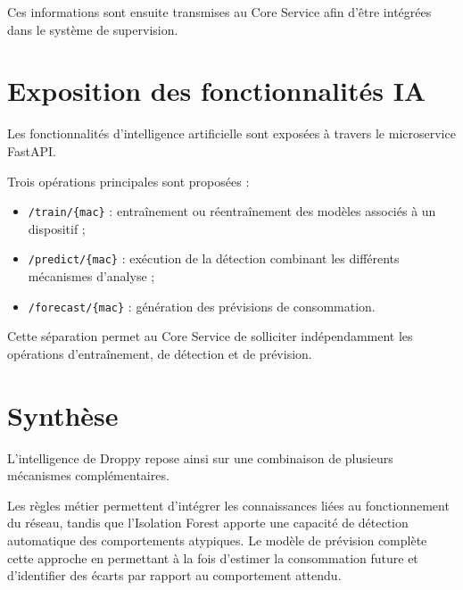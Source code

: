 Ces informations sont ensuite transmises au Core Service afin d'être
intégrées dans le système de supervision.



\section{Exposition des fonctionnalités IA}

Les fonctionnalités d'intelligence artificielle sont exposées à travers le
microservice FastAPI.

Trois opérations principales sont proposées :

\begin{itemize}

    \item \texttt{/train/\{mac\}} : entraînement ou réentraînement des
    modèles associés à un dispositif ;

    \item \texttt{/predict/\{mac\}} : exécution de la détection combinant
    les différents mécanismes d'analyse ;

    \item \texttt{/forecast/\{mac\}} : génération des prévisions de
    consommation.

\end{itemize}

Cette séparation permet au Core Service de solliciter indépendamment les
opérations d'entraînement, de détection et de prévision.



\section{Synthèse}

L'intelligence de Droppy repose ainsi sur une combinaison de plusieurs
mécanismes complémentaires.

Les règles métier permettent d'intégrer les connaissances liées au
fonctionnement du réseau, tandis que l'Isolation Forest apporte une capacité
de détection automatique des comportements atypiques. Le modèle de prévision
complète cette approche en permettant à la fois d'estimer la consommation
future et d'identifier des écarts par rapport au comportement attendu.

